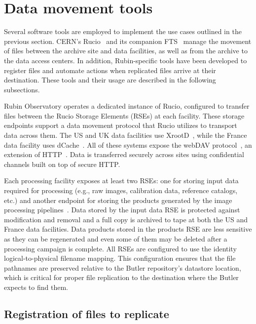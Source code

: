 \documentclass{webofc}
\begin{document}
\section{Data movement tools}
\label{section-data-movement-tools}

Several software tools are employed to implement the use cases outlined in the previous section. CERN's Rucio\ \cite{rucio2019} and its companion FTS\ \cite{FTS} manage the movement of files between the archive site and data facilities, as well as from the archive to the data access centers. In addition, Rubin-specific tools have been developed to register files and automate actions when replicated files arrive at their destination. These tools and their usage are described in the following subsections.

Rubin Observatory operates a dedicated instance of Rucio, configured to transfer files between the Rucio Storage Elements (RSEs) at each facility. These storage endpoints support a data movement protocol that Rucio utilizes to transport data across them. The US and UK data facilities use XrootD\ \cite{xrootd}, while the France data facility uses dCache\ \cite{dCache}. All of these systems expose the webDAV protocol\ \cite{webdav}, an extension of HTTP\ \cite{http1.1}. Data is transferred securely across sites using confidential channels built on top of secure HTTP.

Each processing facility exposes at least two RSEs: one for storing input data required for processing (e.g., raw images, calibration data, reference catalogs, etc.) and another endpoint for storing the products generated by the image processing pipelines\ \cite{DMTN-213}. Data stored by the input data RSE is protected against modification and removal and a full copy is archived to tape at both the US and France data facilities. Data products stored in the products RSE are less sensitive as they can be regenerated and even some of them may be deleted after a processing campaign is complete. All RSEs are configured to use the identity logical-to-physical filename mapping. This configuration ensures that the file pathnames are preserved relative to the Butler repository's datastore location, which is critical for proper file replication to the destination where the Butler expects to find them.

\subsection{Registration of files to replicate}
\label{registration}
\end{document}
